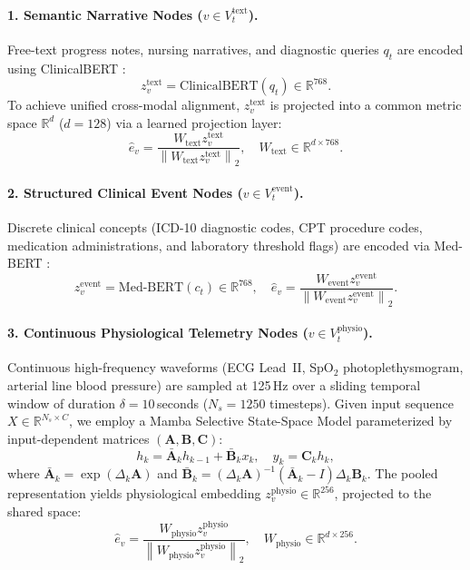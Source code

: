 \documentclass[10pt, onecolumn]{article}
\newcommand{\R}{\mathbb{R}}
\newcommand{\norm}[1]{\left\lVert#1\right\rVert}
\begin{document}
\paragraph{1. Semantic Narrative Nodes ($v \in V_t^{\text{text}}$).}
Free-text progress notes, nursing narratives, and diagnostic queries $q_t$ are encoded using ClinicalBERT \cite{huang2019clinicalbert,alsentzer2019publicly}:
\begin{equation}
  z_v^{\text{text}} = \text{ClinicalBERT}(q_t) \in \R^{768}.
  \label{eq:text_enc}
\end{equation}
To achieve unified cross-modal alignment, $z_v^{\text{text}}$ is projected into a common metric space $\R^d$ ($d=128$) via a learned projection layer:
\begin{equation}
  \hat{e}_v = \frac{W_{\text{text}} z_v^{\text{text}}}{\norm{W_{\text{text}} z_v^{\text{text}}}_2}, \quad W_{\text{text}} \in \R^{d \times 768}.
  \label{eq:text_proj}
\end{equation}

\paragraph{2. Structured Clinical Event Nodes ($v \in V_t^{\text{event}}$).}
Discrete clinical concepts (ICD-10 diagnostic codes, CPT procedure codes, medication administrations, and laboratory threshold flags) are encoded via Med-BERT \cite{rasmy2021medbert}:
\begin{equation}
  z_v^{\text{event}} = \text{Med-BERT}(c_t) \in \R^{768}, \quad \hat{e}_v = \frac{W_{\text{event}} z_v^{\text{event}}}{\norm{W_{\text{event}} z_v^{\text{event}}}_2}.
  \label{eq:event_proj}
\end{equation}

\paragraph{3. Continuous Physiological Telemetry Nodes ($v \in V_t^{\text{physio}}$).}
Continuous high-frequency waveforms (ECG Lead~II, SpO$_2$ photoplethysmogram, arterial line blood pressure) are sampled at 125\,Hz over a sliding temporal window of duration $\delta = 10$\,seconds ($N_s = 1250$ timesteps). Given input sequence $X \in \R^{N_s \times C}$, we employ a Mamba Selective State-Space Model \cite{gu2023mamba} parameterized by input-dependent matrices $(\bm{A}, \bm{B}, \bm{C})$:
\begin{equation}
  h_k = \bar{\bm{A}}_k h_{k-1} + \bar{\bm{B}}_k x_k, \quad y_k = \bm{C}_k h_k,
  \label{eq:mamba_ssm}
\end{equation}
where $\bar{\bm{A}}_k = \exp(\Delta_k \bm{A})$ and $\bar{\bm{B}}_k = (\Delta_k \bm{A})^{-1}(\bar{\bm{A}}_k - I)\Delta_k \bm{B}_k$. The pooled representation yields physiological embedding $z_v^{\text{physio}} \in \R^{256}$, projected to the shared space:
\begin{equation}
  \hat{e}_v = \frac{W_{\text{physio}} z_v^{\text{physio}}}{\norm{W_{\text{physio}} z_v^{\text{physio}}}_2}, \quad W_{\text{physio}} \in \R^{d \times 256}.
  \label{eq:physio_proj}
\end{equation}
\end{document}
